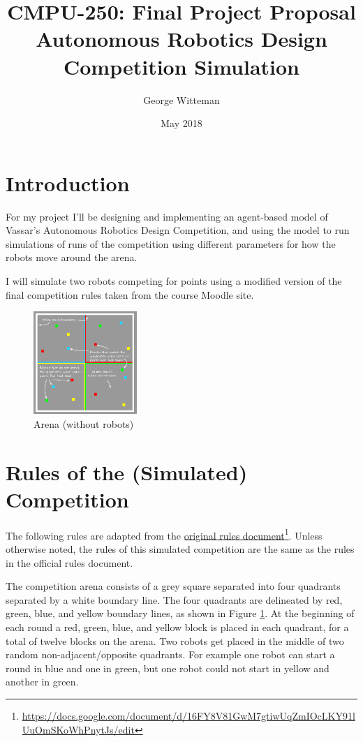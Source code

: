 \documentclass[12pt]{article}
\title{CMPU-250: Final Project Proposal \\
  \large Autonomous Robotics Design Competition Simulation}
\date{May 2018}
\author{George Witteman}
\begin{document}
\maketitle

\section{Introduction}
For my project I'll be designing and implementing an agent-based model of Vassar's Autonomous Robotics Design Competition, and using the model to run simulations of runs of the competition using different parameters for how the robots move around the arena. 

I will simulate two robots competing for points using a modified version of the final competition rules taken from the course Moodle site.

\begin{figure}
  \begin{center}
    \includegraphics[width=0.35\textwidth]{arena.png}
  \end{center}
  \caption{Arena (without robots)}
  \label{fig:arena}
\end{figure}

\section{Rules of the (Simulated) Competition}

The following rules are adapted from the \href{https://docs.google.com/document/d/16FY8V81GwM7gtiwUqZmIOcLKY91lUuOmSKoWhPnytJs/edit}{original rules document}\footnote{\url{https://docs.google.com/document/d/16FY8V81GwM7gtiwUqZmIOcLKY91lUuOmSKoWhPnytJs/edit}}. Unless otherwise noted, the rules of this simulated competition are the same as the rules in the official rules document.

The competition arena consists of a grey square separated into four quadrants separated by a white boundary line. The four quadrants are delineated by red, green, blue, and yellow boundary lines, as shown in Figure \ref{fig:arena}. At the beginning of each round a red, green, blue, and yellow block is placed in each quadrant, for a total of twelve blocks on the arena. Two robots get placed in the middle of two random non-adjacent/opposite quadrants. For example one robot can start a round in blue and one in green, but one robot could not start in yellow and another in green. 
\end{document}
